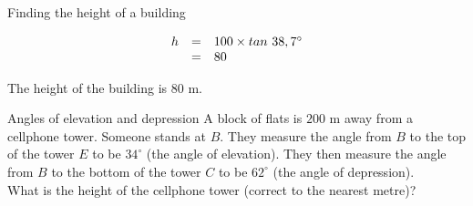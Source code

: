 \begin{wex}{Finding the height of a building}
{\begin{equation*}
\begin{array}{ccl}

\hfill h& =& 100\times tan~38,7^{\circ }\hfill \\
& =& 80\hfill
  \end{array}
\end{equation*}

The height of the building is $80$ m.
}
\end{wex}


\begin{wex}{Angles of elevation and depression}
{A block of flats is $200$ m away from a cellphone tower. Someone stands at $B$. They measure the angle from $B$ to the top of the tower $E$ to be $34^{\circ}$ (the angle of elevation). They then measure the angle from $B$ to the bottom of the tower $C$ to be $62^{\circ}$ (the angle of depression).
\\What is the height of the cellphone tower (correct to the nearest metre)?\\

}
\end{wex}
